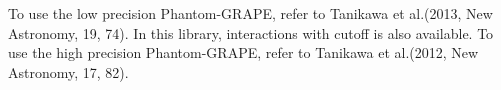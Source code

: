 To use the low precision Phantom-GRAPE, refer to Tanikawa et al.(2013,
New Astronomy, 19, 74). In this library, interactions with cutoff is
also available. To use the high precision Phantom-GRAPE, refer to
Tanikawa et al.(2012, New Astronomy, 17, 82).

